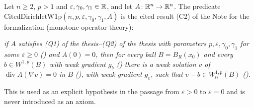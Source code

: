 \begin{definition}
Let $n\ge2$, $p>1$ and $\varepsilon,\gamma_0,\gamma_1\in\mathbb{R}$, and let
$A\colon\mathbb{R}^n\to\mathbb{R}^n$.  The predicate
$\mathrm{CitedDirichletW1p}(n,p,\varepsilon,\gamma_0,\gamma_1,A)$ is the cited
result (C2) of the Note for the formalization (monotone operator theory):

\emph{if $A$ satisfies (Q1) of the thesis--(Q2) of the thesis with parameters
$p,\varepsilon,\gamma_0,\gamma_1$ for some $\varepsilon\ge0$
() and $A(0)=0$, then for every ball
$B=B_R(x_0)$ and every $b\in W^{1,p}(B)$ with weak gradient $g_b$
() there is a weak solution $v$ of
$\operatorname{div}A(\nabla v)=0$ in $B$ (), with weak
gradient $g_v$, such that $v-b\in W^{1,p}_0(B)$ ().}

This is used as an explicit hypothesis in the passage from $\varepsilon>0$ to
$\varepsilon=0$ and is never introduced as an axiom.
\end{definition}
